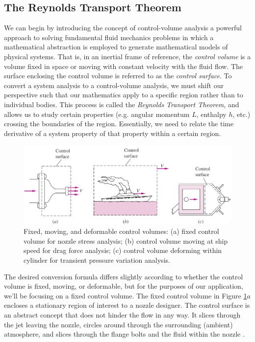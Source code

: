 \documentclass[11pt]{article} %
\numberwithin{equation}{section} %
\begin{document}
\subsection{The Reynolds Transport Theorem}
We can begin by introducing the concept of control-volume analysis \textemdash{} a powerful approach to solving fundamental fluid mechanics problems \textemdash{} in which a mathematical abstraction is employed to generate mathematical models of physical systems. That is, in an inertial frame of reference, the \textit{control volume} is a volume fixed in space or moving with constant velocity with the fluid flow. The surface enclosing the control volume is referred to as the \textit{control surface}. To convert a system analysis to a control-volume analysis, we must shift our perspective such that our mathematics apply to a specific region rather than to individual bodies. This process is called the \textit{Reynolds Transport Theorem}, and allows us to study certain properties (e.g. angular momentum $L$, enthalpy $h$, etc.) crossing the boundaries of the region. Essentially, we need to relate the time derivative of a system property of that property within a certain region.
\begin{figure}[h] 
\centering
\includegraphics[scale=0.5]{control_types}
\caption{Fixed, moving, and deformable control volumes: (a) fixed control volume for nozzle stress analysis; (b) control volume moving at ship speed for drag force analysis; (c) control volume deforming within cylinder for transient pressure variation analysis.}
\label{fig:control-types} %
\end{figure}

The desired conversion formula differs slightly according to whether the control volume is fixed, moving, or deformable, but for the purposes of our application, we'll be focusing on a fixed control volume. The fixed control volume in Figure \ref{fig:control-types}$a$ encloses a stationary region of interest to a nozzle designer. The control surface is an abstract concept that does not hinder the flow in any way. It slices through the jet leaving the nozzle, circles around through the surrounding (ambient) atmosphere, and slices through the flange bolts and the fluid within the nozzle \cite{fluid-mechanics}.
\end{document}
